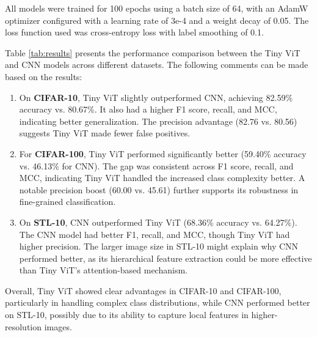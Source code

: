 All models were trained for 100 epochs using a batch size of 64, with an AdamW optimizer configured with a learning rate of 3e-4 and a weight decay of 0.05. The loss function used was cross-entropy loss with label smoothing of 0.1.

Table \ref{tab:results} presents the performance comparison between the Tiny ViT and CNN models across different datasets. The following comments can be made based on the results:
\begin{enumerate}
  \item On \textbf{CIFAR-10}, Tiny ViT slightly outperformed CNN, achieving 82.59\% accuracy vs. 80.67\%. It also had a higher F1 score, recall, and MCC, indicating better generalization. The precision advantage (82.76 vs. 80.56) suggests Tiny ViT made fewer false positives.
  \item For \textbf{CIFAR-100}, Tiny ViT performed significantly better (59.40\% accuracy vs. 46.13\% for CNN). The gap was consistent across F1 score, recall, and MCC, indicating Tiny ViT handled the increased class complexity better. A notable precision boost (60.00 vs. 45.61) further supports its robustness in fine-grained classification.
  \item On \textbf{STL-10}, CNN outperformed Tiny ViT (68.36\% accuracy vs. 64.27\%). The CNN model had better F1, recall, and MCC, though Tiny ViT had higher precision. The larger image size in STL-10 might explain why CNN performed better, as its hierarchical feature extraction could be more effective than Tiny ViT’s attention-based mechanism.
\end{enumerate}

Overall, Tiny ViT showed clear advantages in CIFAR-10 and CIFAR-100, particularly in handling complex class distributions, while CNN performed better on STL-10, possibly due to its ability to capture local features in higher-resolution images.